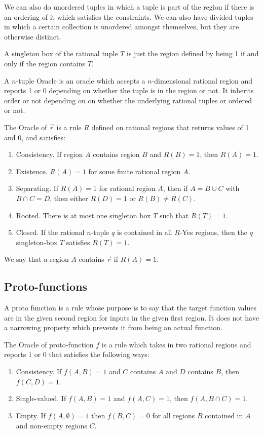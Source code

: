 \documentclass[12pt]{article}
\theoremstyle{remark}
\begin{document}
We can also do unordered tuples in which a tuple is part of the region if there is an ordering of it which satisfies the constraints. We can also have divided tuples in which a certain collection is unordered amongst themselves, but they are otherwise distinct. 

A singleton box of the rational tuple $T$ is just the region defined by being 1 if and only if the region contains $T$.

A $n$-tuple Oracle is an oracle which accepts a $n$-dimensional rational region and reports 1 or 0 depending on whether the tuple is in the region or not. It inherits order or not depending on on whether the underlying rational tuples or ordered or not. 

The Oracle of $\Vec{r}$ is a rule $R$ defined on rational regions that returns values of 1 and 0, and satisfies: 
\begin{enumerate}
    \item Consistency. If region $A$ contains region $B$ and $R(B) = 1$, then $R(A) = 1$.
    \item Existence. $R(A) = 1$ for some finite rational region $A$.
    \item Separating. If $R(A)=1$ for rational region $A$, then if $A = B \cup C$ with $B \cap C = D$, then either $R(D) = 1$ or $R(B) \neq R(C)$. 
    \item Rooted. There is at most one singleton box $T$ such that $R(T) =1$.
    \item Closed. If the rational $n$-tuple $q$ is contained in all $R$-Yes regions, then the $q$ singleton-box $T$ satisfies $R(T) = 1$.
\end{enumerate}

We say that a region $A$ contains $\Vec{r}$ if $R(A) = 1$.


\subsection{Proto-functions}

A proto function is a rule whose purpose is to say that the target function values are in the given second region for inputs in the given first region. It does not have a narrowing property which prevents it from being an actual function. 

The Oracle of proto-function $f$ is a rule which takes in two rational regions and reports $1$ or $0$ that satisfies the following ways: 
\begin{enumerate}
    \item Consistency. If $f(A,B) = 1$ and $C$ contains $A$ and $D$ contains $B$, then $f(C,D) = 1$.
    \item Single-valued. If $f(A,B)=1$ and $f(A,C)=1$, then $f(A, B \cap C) = 1$. 
    \item Empty. If $f(A, \emptyset) = 1$ then $f(B, C) = 0$ for all regions $B$ contained in $A$ and non-empty regions $C$.
\end{enumerate}
\end{document}
